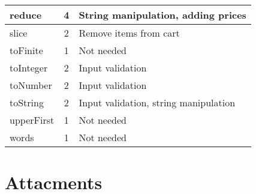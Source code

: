 \documentclass[a4paper, 12pt]{article}
\begin{document}
\begin{table}[h]
\begin{tabular}{l|c|l}
    reduce       & 4                 & String manipulation, adding prices    \\ \hline
    slice        & 2                 & Remove items from cart                \\ \hline
    toFinite     & 1                 & Not needed                            \\ \hline
    toInteger    & 2                 & Input validation                      \\ \hline
    toNumber     & 2                 & Input validation                      \\  \hline
    toString     & 2                 & Input validation, string manipulation \\ \hline
    upperFirst   & 1                 & Not needed                            \\ \hline
    words        & 1                 & Not needed                           
    \end{tabular}
    \end{table}








            
            
           
            
            
            
            
            
            
            
            
            
            \section*{Attacments}
            
\end{document}
